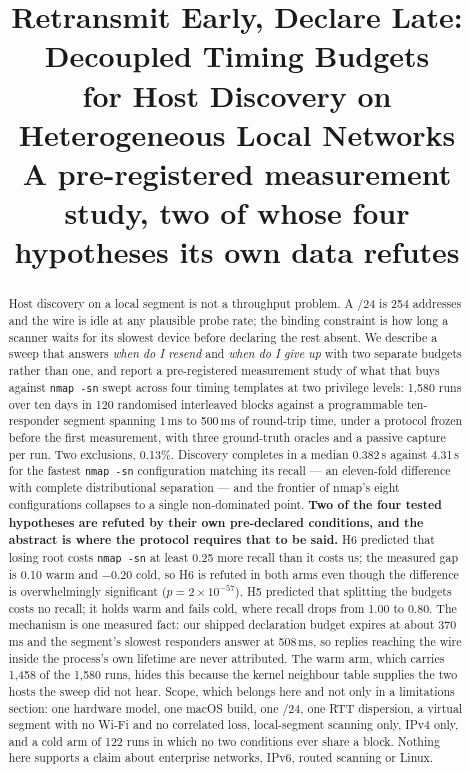 \documentclass[conference]{IEEEtran}
\newcommand{\nmapsn}{\texttt{nmap -sn}}
\begin{document}
\title{Retransmit Early, Declare Late: Decoupled Timing Budgets\\for Host
Discovery on Heterogeneous Local Networks\\
\large A pre-registered measurement study, two of whose four hypotheses
its own data refutes}

\author{
}

\maketitle

\begin{abstract}
Host discovery on a local segment is not a throughput problem. A /24 is 254
addresses and the wire is idle at any plausible probe rate; the binding
constraint is how long a scanner waits for its slowest device before declaring
the rest absent. We describe a sweep that answers \emph{when do I resend} and
\emph{when do I give up} with two separate budgets rather than one, and report
a pre-registered measurement study of what that buys against \nmapsn{} swept
across four timing templates at two privilege levels: 1{,}580 runs over ten
days in 120 randomised interleaved blocks against a programmable
ten-responder segment spanning 1\,ms to 500\,ms of round-trip time, under a
protocol frozen before the first measurement, with three ground-truth oracles
and a passive capture per run. Two exclusions, 0.13\%.
%
Discovery completes in a median 0.382\,s against 4.31\,s for the fastest
\nmapsn{} configuration matching its recall --- an eleven-fold difference with
complete distributional separation --- and the frontier of nmap's eight
configurations collapses to a single non-dominated point.
%
\textbf{Two of the four tested hypotheses are refuted by their own
pre-declared conditions, and the abstract is where the protocol requires that
to be said.} H6 predicted that losing root costs \nmapsn{} at least 0.25 more
recall than it costs us; the measured gap is 0.10 warm and $-0.20$ cold, so H6
is refuted in both arms even though the difference is overwhelmingly
significant ($p=2\times10^{-57}$). H5 predicted that splitting the budgets
costs no recall; it holds warm and fails cold, where recall drops from 1.00 to
0.80. The mechanism is one measured fact: our shipped declaration budget
expires at about 370\,ms and the segment's slowest responders answer at
508\,ms, so replies reaching the wire inside the process's own lifetime are
never attributed. The warm arm, which carries 1{,}458 of the 1{,}580 runs,
hides this because the kernel neighbour table supplies the two hosts the sweep
did not hear.
%
Scope, which belongs here and not only in a limitations section: one hardware
model, one macOS build, one /24, one RTT dispersion, a virtual segment with no
Wi-Fi and no correlated loss, local-segment scanning only, IPv4 only, and a
cold arm of 122 runs in which no two conditions ever share a block. Nothing
here supports a claim about enterprise networks, IPv6, routed scanning or
Linux.
\end{abstract}
\end{document}
